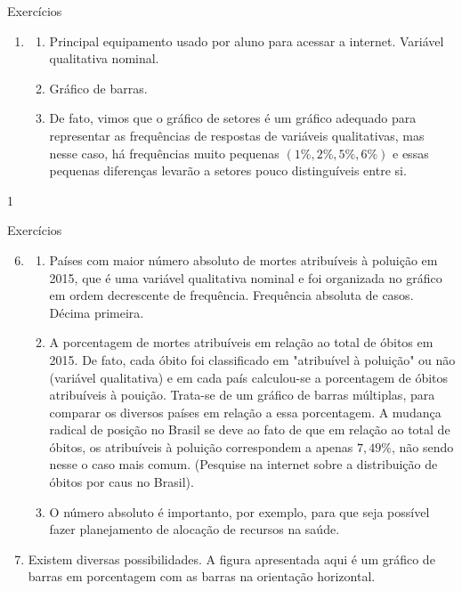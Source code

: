 {\begin{answer}{Exercícios}
{\begin{enumerate}
  \begin{enumerate}
  \item Amostra 
  \item "Você deseja viver até os 100 anos?"
  \item "Até que idade você gostaria de viver?"
  \end{enumerate}
  \item 
  \begin{enumerate}
  \item Principal equipamento usado por aluno para acessar a internet. Variável qualitativa nominal.
  \item Gráfico de barras.
  \item De fato, vimos que o gráfico de setores é um gráfico adequado para representar as frequências de respostas de variáveis qualitativas, mas nesse caso, há frequências muito pequenas $(1\%,2\%,5\%,6\%)$ e essas pequenas diferenças levarão a setores pouco distinguíveis entre si.
  \end{enumerate}
  \end{enumerate}
}{1}
\end{answer}
\clearmargin
\begin{answer}{Exercícios}
{\exerciselist
  \begin{enumerate}\setcounter{enumi}{5}
  \item 
  \begin{enumerate}
  \item Países com maior número absoluto de mortes atribuíveis à poluição em 2015, que é uma variável qualitativa nominal e foi organizada no gráfico em ordem decrescente de frequência. Frequência absoluta de casos. Décima primeira.
  \item A porcentagem de mortes atribuíveis em relação ao total de óbitos em 2015. De fato, cada óbito foi classificado em "atribuível à poluição"{} ou não (variável qualitativa) e em cada país calculou-se a porcentagem de óbitos atribuíveis à pouição. Trata-se de um gráfico de barras múltiplas, para comparar os diversos países em relação a essa porcentagem. A mudança radical de posição no Brasil se deve ao fato de que em relação ao total de óbitos, os atribuíveis à poluição correspondem a apenas $7{,}49\%$, não sendo nesse o caso mais comum. (Pesquise na internet sobre a distribuição de óbitos por caus no Brasil).
  \item O número absoluto é importanto, por exemplo, para que seja possível fazer planejamento de alocação de recursos na saúde.
  \end{enumerate}
  \item Existem diversas possibilidades. A figura apresentada aqui é um gráfico de barras em porcentagem com as barras na orientação horizontal.
  \begin{figure}[H]
  \centering
  

\end{figure}
\end{enumerate}}
\end{answer}}
